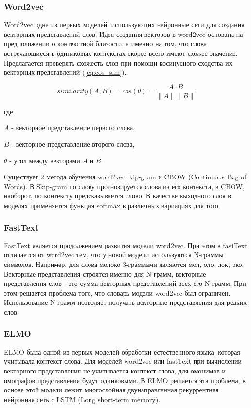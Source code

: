 \documentclass[a4paper,14pt]{article}
\begin{document}
	\subsubsection{Word2vec}
	
	Word2vec одна из первых моделей, использующих нейронные сети для создания векторных представлений слов.
	Идея создания векторов в word2vec основана на предположении о контекстной близости, а именно на том, что слова встречающиеся в одинаковых контекстах скорее всего имеют схожее значение.
	Предлагается проверять схожесть слов при помощи косинусного сходства их векторных представлений (\ref{eq:cos_sim}).
	
	\begin{equation}
		similarity(A,B) = cos(\theta) = \dfrac{A\cdot B}{\|A\| \|B\|}
		\label{eq:cos_sim}
	\end{equation}

	где
	
	$A$ - векторное представление первого слова,
	
	$B$ - векторное представление второго слова,
	
	$\theta$ - угол между векторами $A$ и $B$.
	
	Существует 2 метода обучения word2vec: kip-gram и CBOW (Continuous Bag of Words).
	В Skip-gram по слову прогнозируется слова из его контекста, в CBOW, наоборот, по контексту предсказывается слово.
	В качестве выходного слоя в моделях применяется функция softmax в различных вариациях для того.
		
	\subsubsection{FastText}
	
	FastText является продолжением развития модели word2vec.
	При этом в fastText отличается от word2vec тем, что у новой модели используются N-граммы символов.
	Например, для слова молоко 3-граммами являются мол, оло, лок, око.
	Векторные представления строятся именно для N-грамм, векторные представления слов - это сумма векторных представлений всех его N-грамм.
	При этом решается проблема того, что словарь модели word2vec был ограничен.
	Использование N-грамм позволяет получать векторные представления для редких слов.
	
	\subsubsection{ELMO}
	
	ELMO была одной из первых моделей обработки естественного языка, которая учитывала контекст слова.
	Для моделей word2vec или fastText при вычислении векторного представления не учитывается контекст слова, для омонимов и омографов представления будут одинковыми.
	В ELMO решается эта проблема, в основе этой модели лежит многослойная двунаправленная рекуррентная нейронная сеть c LSTM (Long short-term memory).
	
\end{document}
